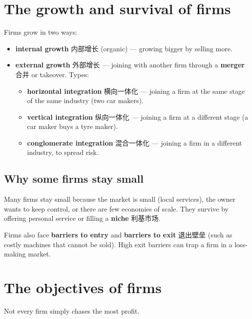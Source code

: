 \documentclass[11pt]{article}
\begin{document}
\section*{The growth and survival of firms}

Firms grow in two ways:

\begin{itemize}
\item \textbf{internal growth} 内部增长 (organic) — growing bigger by selling more.

\item \textbf{external growth} 外部增长 — joining with another firm through a \textbf{merger} 合并 or takeover. Types:

\begin{itemize}
\item \textbf{horizontal integration} 横向一体化 — joining a firm at the same stage of the same industry (two car makers).

\item \textbf{vertical integration} 纵向一体化 — joining a firm at a different stage (a car maker buys a tyre maker).

\item \textbf{conglomerate integration} 混合一体化 — joining a firm in a different industry, to spread risk.

\end{itemize}

\end{itemize}

\subsection*{Why some firms stay small}

Many firms stay small because the market is small (local services), the owner wants to keep control, or there are few economies of scale. They survive by offering personal service or filling a \textbf{niche} 利基市场.

Firms also face \textbf{barriers to entry} and \textbf{barriers to exit} 退出壁垒 (such as costly machines that cannot be sold). High exit barriers can trap a firm in a loss-making market.

\section*{The objectives of firms}

Not every firm simply chases the most profit.
\end{document}

